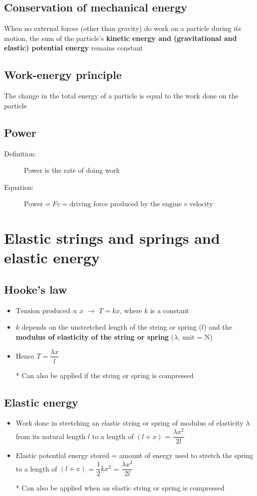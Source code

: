 \documentclass[11pt, A4paper]{article}
\begin{document}
	
	
	\subsection{Conservation of mechanical energy}
	When no external forces (other than gravity) do work on a particle during its motion, the sum of the particle's \textbf{kinetic energy and (gravitational and elastic) potential energy} remains constant
	
	\subsection{Work-energy principle}
	The change in the total energy of a particle is equal to the work done on the particle
	
	\subsection{Power}
	\begin{description}
		\item[Definition:] Power is the rate of doing work
		\item[Equation:] $\text{Power}=Fv=\text{driving force produced by the engine}\times\text{velocity}$
	\end{description}
	
	\section[3 Elastic strings and springs and elastic energy]{Elastic strings and springs and elastic energy}
	\subsection{Hooke's law}
	\begin{itemize}
		\item $\text{Tension produced}\propto x$ $\rightarrow$ $T=kx$, where $k$ is a constant
		\item $k$ depends on the unstretched length of the string or spring ($l$) and the \textbf{modulus of elasticity of the string or spring} ($\lambda$, unit = N)
		\item Hence $T=\dfrac{\lambda x}{l}$
		\item[*] Can also be applied if the string or spring is compressed
	\end{itemize}
	
	\subsection{Elastic energy}
	\begin{itemize}
		\item Work done in stretching an elastic string or spring of modulus of elasticity $\lambda$ from its natural length $l$ to a length of $(l+x)$ = $\dfrac{\lambda x^2}{2l}$
		\item Elastic potential energy stored = amount of energy used to stretch the spring to a length of $(l+x)$ = $\dfrac{1}{2}kx^2$ = $\dfrac{\lambda x^2}{2l}$
		\item[*] Can also be applied when an elastic string or spring is compressed
	\end{itemize}
	
\end{document}
